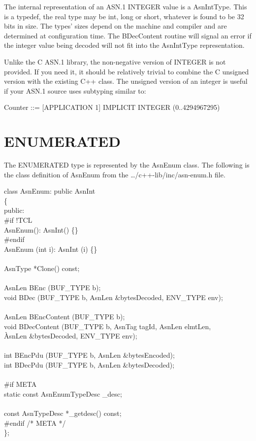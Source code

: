 The internal representation of an ASN.1 INTEGER value is a {\C AsnIntType}.
This is a {\C typedef}, the real type may be {\C int}, {\C long} or {\C short}, whatever is found to be 32 bits in size.
The types' sizes depend on the machine and compiler and are determined at configuration time.
The {\C BDecContent} routine will signal an error if the integer
value being decoded will not fit into the {\C AsnIntType}
representation.

Unlike the C ASN.1 library, the non-negative
version of
INTEGER is not provided.  If you need it, it should be relatively
trivial to combine the C unsigned version with the existing C++ class.
The unsigned version of an integer is useful if your ASN.1 source uses
subtyping similar to:
\begin{ASNcode}
Counter ::= [APPLICATION 1] IMPLICIT INTEGER (0..4294967295)
\end{ASNcode}

\section{\label{enum-C++-section}ENUMERATED}

The ENUMERATED type is represented by the {\C AsnEnum} class. The
following is the class definition of {\C AsnEnum} from the
{\ufn \dots/c++-lib/inc/asn-enum.h} file.
\begin{Ccode}
class AsnEnum: public AsnInt\\
\{\\
public:\+\\
\<\#if !TCL\\
				\>\>AsnEnum(): AsnInt() \{\}\\
\<\#endif\\
				\>\>AsnEnum (int i): AsnInt (i) \{\}\\
\\
  AsnType			\>\>*Clone() const;\\
\\
  AsnLen			\>\>BEnc (BUF\_TYPE b);\\
  void				\>\>BDec (BUF\_TYPE b, AsnLen \&bytesDecoded, ENV\_TYPE env);\\
\\
  AsnLen			\>\>BEncContent (BUF\_TYPE b);\\
  void				\>\>BDecContent (BUF\_TYPE b, AsnTag tagId, AsnLen elmtLen,\\
           		                \`AsnLen \&bytesDecoded, ENV\_TYPE env);\\
\\
  int				\>\>BEncPdu (BUF\_TYPE b, AsnLen \&bytesEncoded);\\
  int				\>\>BDecPdu (BUF\_TYPE b, AsnLen \&bytesDecoded);\\
\\
\<\#if META\\
  static const AsnEnumTypeDesc	\>\>\_desc;\\
\\
  const AsnTypeDesc		\>\>*\_getdesc() const;\-\\
\#endif /* META */\\
\};
\end{Ccode}

